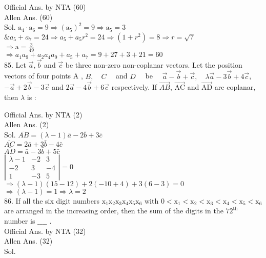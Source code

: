 \documentclass[10pt]{article}
\begin{document}
Official Ans. by NTA (60)\\
Allen Ans. (60)\\
Sol. \(\mathrm{a}_{4} \cdot \mathrm{a}_{6}=9 \Rightarrow\left(\mathrm{a}_{5}\right)^{2}=9 \Rightarrow \mathrm{a}_{5}=3\)\\
\(\& a_{5}+a_{7}=24 \Rightarrow a_{5}+a_{5} r^{2}=24 \Rightarrow\left(1+r^{2}\right)=8 \Rightarrow r=\sqrt{7}\)\\
\(\Rightarrow \mathrm{a}=\frac{3}{49}\)\\
\(\Rightarrow a_{1} a_{9}+a_{2} a_{4} a_{9}+a_{5}+a_{7}=9+27+3+21=60\)\\
85. Let \(\vec{a}, \vec{b}\) and \(\vec{c}\) be three non-zero non-coplanar vectors. Let the position vectors of four points A , \(B, \quad C \quad\) and \(D \quad\) be \(\quad \vec{a}-\vec{b}+\vec{c}, \quad \lambda \vec{a}-3 \vec{b}+4 \vec{c}\), \(-\vec{a}+2 \vec{b}-3 \vec{c}\) and \(2 \vec{a}-4 \vec{b}+6 \vec{c}\) respectively. If \(\overrightarrow{A B}\), \(\overrightarrow{\mathrm{AC}}\) and \(\overrightarrow{\mathrm{AD}}\) are coplanar, then \(\lambda\) is :

Official Ans. by NTA (2)\\
Allen Ans. (2)\\
Sol. \(\overline{A B}=(\lambda-1) \bar{a}-2 \bar{b}+3 \bar{c}\)\\
\(\overline{A C}=2 \bar{a}+3 \bar{b}-4 \bar{c}\)\\
\(\overline{A D}=\bar{a}-3 \bar{b}+5 \bar{c}\)\\
\(\left|\begin{array}{ccc}\lambda-1 & -2 & 3 \\ -2 & 3 & -4 \\ 1 & -3 & 5\end{array}\right|=0\)\\
\(\Rightarrow(\lambda-1)(15-12)+2(-10+4)+3(6-3)=0\)\\
\(\Rightarrow(\lambda-1)=1 \Rightarrow \lambda=2\)\\
86. If all the six digit numbers \(\mathrm{x}_{1} \mathrm{x}_{2} \mathrm{x}_{3} \mathrm{x}_{4} \mathrm{x}_{5} \mathrm{x}_{6}\) with \(0<\mathrm{x}_{1}<\mathrm{x}_{2}<\mathrm{x}_{3}<\mathrm{x}_{4}<\mathrm{x}_{5}<\mathrm{x}_{6}\) are arranged in the increasing order, then the sum of the digits in the \(72^{\text {th }}\) number is \(\_\_\_\_\) .\\
Official Ans. by NTA (32)\\
Allen Ans. (32)\\
Sol.
\end{document}
